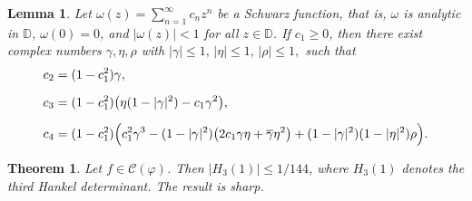 \documentclass[10pt,a4paper]{amsart}
\newtheorem{lem}{Lemma}
\newtheorem{thm}{Theorem}
\begin{document}
\begin{lem}\label{lemma3}
Let
$
\omega(z)=\sum_{n=1}^{\infty}c_n z^n
$
be a Schwarz function, that is, $\omega$ is analytic in $\mathbb D$,
$\omega(0)=0$, and $|\omega(z)|<1$ for all $z\in\mathbb D$.
If $c_1\ge 0$, then there exist complex numbers $\gamma,\eta,\rho$
with
$
|\gamma|\le 1,\, |\eta|\le 1,\, |\rho|\le 1,
$
such that
\begin{align*}
c_2 &= (1-c_1^2)\gamma,\\[2mm]
c_3 &= (1-c_1^2)\bigl(\eta(1-|\gamma|^2)-c_1\gamma^2\bigr),\\[2mm]
c_4 &= (1-c_1^2)\Bigl(
c_1^2\gamma^3
-(1-|\gamma|^2)\bigl(2c_1\gamma\eta+\overline{\gamma}\eta^2\bigr)
+(1-|\gamma|^2)(1-|\eta|^2)\rho
\Bigr).
\end{align*}
\end{lem}

\begin{thm}
Let $f\in \mathcal{C}(\varphi)$. Then $|H_3(1)|\leq {1}/{144}$, where $H_3(1)$ denotes the third Hankel determinant. The result is sharp.
\end{thm}
\end{document}
